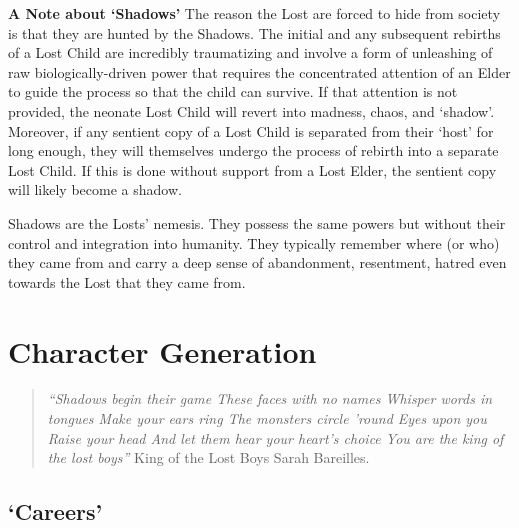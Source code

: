 \documentclass[letterpaper,serif]{rpg-module}
\begin{document}
\textbf{A Note about `Shadows'}\newline
The reason the Lost are forced to hide from society is that they are hunted by the Shadows. The initial and any subsequent rebirths of a Lost Child are incredibly traumatizing and involve a form of unleashing of raw biologically-driven power that requires the concentrated attention of an Elder to guide the process so that the child can survive. If that attention is not provided, the neonate Lost Child will revert into madness, chaos, and `shadow'. Moreover, if any sentient copy of a Lost Child is separated from their `host' for long enough, they will themselves undergo the process of rebirth into a separate Lost Child. If this is done without support from a Lost Elder, the sentient copy will likely become a shadow.  

Shadows are the Losts' nemesis. They possess the same powers but without their control and integration into humanity. They typically remember where (or who) they came from and carry a deep sense of abandonment, resentment, hatred even towards the Lost that they came from.    

\section{Character Generation}

\begin{quote}
\emph{``Shadows begin their game\newline
These faces with no names\newline
Whisper words in tongues\newline
Make your ears ring\newline
The monsters circle 'round\newline
Eyes upon you \newline
Raise your head\newline
And let them hear your heart's choice\newline
You are the king of the lost boys''}\newline
\newline
King of the Lost Boys \newline
Sarah Bareilles. 
\end{quote}

\subsection{`Careers'}
\end{document}
